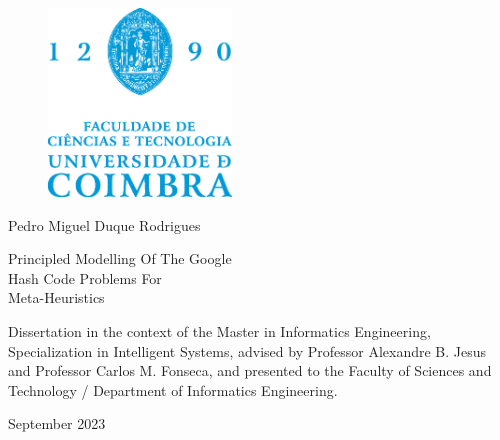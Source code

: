 \begin{cover}
  \vspace*{\fill}

  \begin{figure}[h!]
    \centering
    \includegraphics[height=5cm, keepaspectratio]{../assets/cover/fctuc-logo.eps}
  \end{figure}

  \vspace{\fill}

  \large{Pedro Miguel Duque Rodrigues}

  \vspace*{\fill}

  \LARGE{\sffamily Principled Modelling Of The Google \\ Hash Code Problems For \\ Meta-Heuristics}

  \vspace*{\fill}

  \normalsize{
    Dissertation in the context of the Master in Informatics Engineering,
    Specialization in Intelligent Systems, advised by Professor Alexandre B. Jesus
    and Professor Carlos M. Fonseca, and presented to the Faculty of
    Sciences and Technology / Department of Informatics Engineering.
  }

  \vspace{\fill}

  \normalsize{\centering September 2023}

  \vspace*{\fill}
\end{cover}